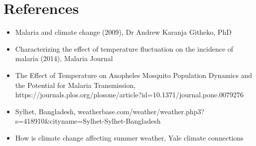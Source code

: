 \documentclass[fontsize=11pt]{article}
\begin{document}
    \section*{References}

    \begin{itemize}
        \item Malaria and climate change (2009), Dr Andrew Karanja Githeko, PhD
        \item Characterizing the effect of temperature fluctuation on the incidence of malaria (2014), Malaria Journal
        \item The Effect of Temperature on Anopheles Mosquito Population Dynamics and the Potential for Malaria Transmission, https://journals.plos.org/plosone/article?id=10.1371/journal.pone.0079276
        \item Sylhet, Bangladesh, weatherbase.com/weather/weather.php3?s=418910&cityname=Sylhet-Sylhet-Bangladesh
        \item How is climate change affecting summer weather, Yale climate connections
    \end{itemize}
\end{document}
